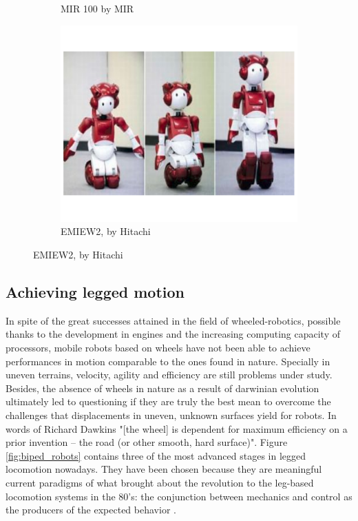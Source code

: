 \begin{figure}[h]
\begin{subfigure}[b]{0.32\textwidth}
        \caption{MIR 100 by MIR}
        \label{fig:mobile_mir}
    \end{subfigure}
    \centering
    \begin{subfigure}[b]{0.32\textwidth}
        \includegraphics[width=\textwidth]{figures/mobile_hitachi.pdf}
        \caption{EMIEW2, by Hitachi}
        \label{fig:mobile_hitachi}
    \end{subfigure}
\end{figure}


\subsection{Achieving legged motion} %
\label{sub:legged_motion_in_robotics}
In spite of the great successes attained in the field of wheeled-robotics, possible thanks to the development in engines and the increasing computing capacity of processors, mobile robots based on wheels have not been able to achieve performances in motion comparable to the ones found in nature.
Specially in uneven terrains, velocity, agility and efficiency are still problems under study.
Besides, the absence of wheels in nature as a result of darwinian evolution ultimately led to questioning \cite{dawkins} if they are truly the best mean to overcome the challenges that displacements in uneven, unknown surfaces yield for robots.
In words of Richard Dawkins \cite{dawkins} "[the wheel] is dependent for maximum efficiency on a prior invention – the road (or other smooth, hard surface)". 
Figure \ref{fig:biped_robots} contains three of the most advanced stages in legged locomotion nowadays.
They have been chosen because they are meaningful current paradigms of what brought about the revolution to the leg-based locomotion systems in the 80's: the conjunction between mechanics and control as the producers of the expected behavior \cite{mit_leg_lab1}.


